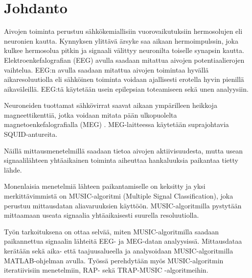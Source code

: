 \section{Johdanto}
Aivojen toiminta perustuu sähkökemiallisiin vuorovaikutuksiin hermosolujen eli neuronien kautta. Kynnyksen ylittävä ärsyke saa aikaan hermoimpulssin, joka kulkee hermosolua pitkin ja signaali välittyy neuronilta toiselle synapsin kautta.\cite{} 
Elektroenkefalografian (EEG) avulla saadaan mitattua aivojen potentiaalierojen vaihtelua. EEG:n avulla saadaan mitattua aivojen toimintaa hyvällä aikaresoluutiolla eli sähköinen toiminta voidaan ajallisesti erotella hyvin pienillä aikaväleillä. EEG:tä käytetään usein epilepsian toteamiseen sekä unen analyysiin. \cite{Nunez2006ElectricBrain}

Neuroneiden tuottamat sähkövirrat saavat aikaan ympärilleen heikkoja magneettikenttiä, jotka voidaan mitata pään ulkopuolelta magnetoenkefalografialla (MEG) \cite{Hamalainen1993MagnetoencephalographytheoryBrain}. MEG-laitteessa käytetään suprajohtavia SQUID-antureita. 

Näillä mittausmenetelmillä saadaan tietoa aivojen aktiivisuudesta, mutta usean signaalilähteen yhtäaikainen toiminta aiheuttaa hankaluuksia paikantaa tietty lähde. 

Monenlaisia menetelmiä lähteen paikantamiselle on keksitty ja yksi merkittävimmistä on MUSIC-algoritmi (Multiple Signal Classification), joka perustuu mittausdatan aliavaruuksien käyttöön. MUSIC-algoritmilla pystytään mittaamaan useata signaalia yhtäaikaisesti suurella resoluutiolla. \cite{Mosher1999SourceMUSIC}

Työn tarkoituksena on ottaa selvää, miten MUSIC-algoritmilla saadaan paikannettua signaalin lähteitä EEG- ja MEG-datan analyysissä. Mittausdataa kerätään sekä aika- että taajuusalueella ja analysoidaan MUSIC-algoritmilla MATLAB-ohjelman avulla. Työssä perehdytään myös MUSIC-algoritmin iteratiivisiin menetelmiin, RAP- sekä TRAP-MUSIC -algoritmeihin.
